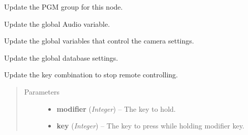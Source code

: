 \documentclass[letterpaper,10pt,english]{sphinxmanual}
\begin{document}

\begin{fulllineitems}
\label{diwavars:diwavars.update_PGM_group}
Update the PGM group for this node.

\end{fulllineitems}


\begin{fulllineitems}
\label{diwavars:diwavars.update_audio}
Update the global Audio variable.

\end{fulllineitems}


\begin{fulllineitems}
\label{diwavars:diwavars.update_camera_vars}
Update the global variables that control the camera settings.

\end{fulllineitems}


\begin{fulllineitems}
\label{diwavars:diwavars.update_database_vars}
Update the global database settings.

\end{fulllineitems}


\begin{fulllineitems}
\label{diwavars:diwavars.update_keys}
Update the key combination to stop remote controlling.
\begin{quote}\begin{description}
\item[{Parameters}] \leavevmode\begin{itemize}
\item {} 
\textbf{modifier} (\emph{Integer}) -- The key to hold.

\item {} 
\textbf{key} (\emph{Integer}) -- The key to press while holding modifier key.

\end{itemize}

\end{description}\end{quote}

\end{fulllineitems}
\end{document}
